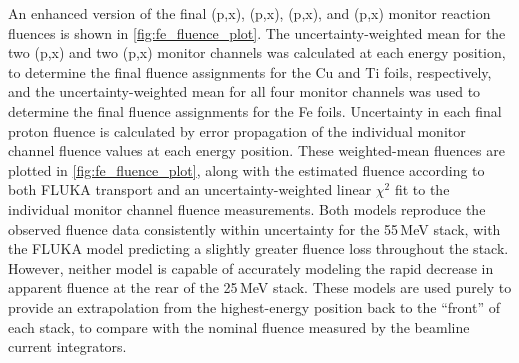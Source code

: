 % 
An enhanced version of the final (p,x), (p,x), (p,x), and (p,x) monitor reaction fluences is shown in \autoref{fig:fe_fluence_plot}.
The uncertainty-weighted mean  for the two (p,x) and two (p,x) monitor channels was calculated at each energy position, to determine the final fluence assignments for the Cu and Ti foils, respectively, and the uncertainty-weighted mean  for all four monitor channels was used to determine the final fluence assignments for the Fe foils.
Uncertainty in each final proton fluence  is  calculated by error propagation of the individual monitor channel fluence values  at each energy position.
These weighted-mean fluences are  plotted  in \autoref{fig:fe_fluence_plot}, along with the estimated fluence according to both  FLUKA transport 
and an uncertainty-weighted linear $\chi^2$ fit to the individual monitor channel fluence measurements.
Both models reproduce the observed fluence data consistently within uncertainty for the 55\,MeV stack, with the FLUKA model predicting a slightly greater fluence loss throughout the stack.
However, neither model is capable of accurately modeling the rapid decrease in apparent fluence at the rear of the 25\,MeV stack.   
These models are used purely to provide an extrapolation from the highest-energy position back to the \enquote{front} of each stack, to compare with the nominal fluence measured by  the beamline current integrators.
% 
% 
% 
% 
% 



